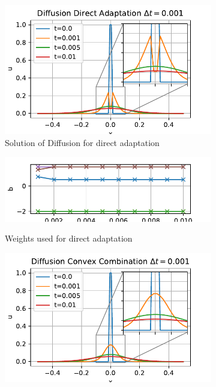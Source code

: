 \documentclass[a4paper]{scrartcl}
\numberwithin{equation}{section}
\theoremstyle{plain}
\theoremstyle{definition}
\numberwithin{theorem}{section}
\newcommand{\1}{\mathbbm{1}}
\begin{document}
\begin{figure}
\centering
\begin{subfigure}[b]{0.45\textwidth}
\includegraphics[width=1\textwidth]{plots/Diff_Direct.pdf}\\
\caption{Solution of Diffusion for direct adaptation}
\label{fig:sol_Diff_a}
\includegraphics[width=1\textwidth]{plots/b_Diff_Direct.pdf}\\
\caption{Weights used for direct adaptation}
\label{fig:weights_Diff_a}
\end{subfigure}
\begin{subfigure}[b]{0.45\textwidth}
\includegraphics[width=1\textwidth]{plots/Diff_Convex.pdf}\\

\end{subfigure}
\end{figure}
\end{document}
